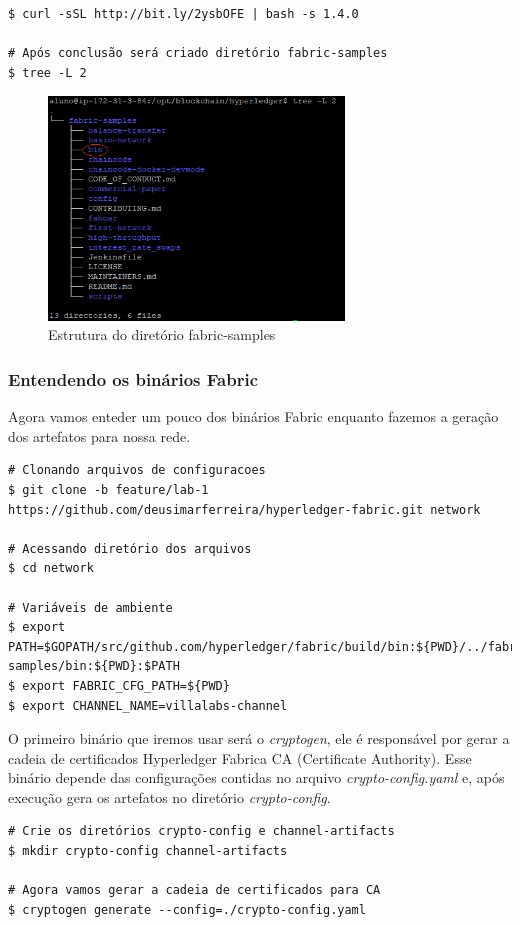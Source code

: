 \documentclass[a4paper,11pt]{article}
\begin{document}
\begin{lstlisting}
$ curl -sSL http://bit.ly/2ysbOFE | bash -s 1.4.0

# Após conclusão será criado diretório fabric-samples
$ tree -L 2
\end{lstlisting}
\begin{figure}[H]
	\centering
	\includegraphics[width=0.7\textwidth]{imagens/path-fabric-samples.png}
	\caption{Estrutura do diretório fabric-samples}
\end{figure}

\subsubsection{Entendendo os binários Fabric\cite{hyperledgerfabric}}
Agora vamos enteder um pouco dos binários Fabric\cite{hyperledgerfabric} enquanto fazemos a geração dos artefatos para nossa rede.

\begin{lstlisting}
# Clonando arquivos de configuracoes
$ git clone -b feature/lab-1 https://github.com/deusimarferreira/hyperledger-fabric.git network

# Acessando diretório dos arquivos
$ cd network

# Variáveis de ambiente
$ export PATH=$GOPATH/src/github.com/hyperledger/fabric/build/bin:${PWD}/../fabric-samples/bin:${PWD}:$PATH
$ export FABRIC_CFG_PATH=${PWD}
$ export CHANNEL_NAME=villalabs-channel
\end{lstlisting}

O primeiro binário que iremos usar será o \textit{cryptogen}, ele é responsável por gerar a cadeia de certificados Hyperledger\cite{hyperledger} Fabrica\cite{hyperledgerfabric} CA (Certificate Authority). Esse binário depende das configurações contidas no arquivo \textit{crypto-config.yaml} e, após execução gera os artefatos no diretório \textit{crypto-config}.
\begin{lstlisting}
# Crie os diretórios crypto-config e channel-artifacts  
$ mkdir crypto-config channel-artifacts

# Agora vamos gerar a cadeia de certificados para CA
$ cryptogen generate --config=./crypto-config.yaml
\end{lstlisting}
\end{document}
